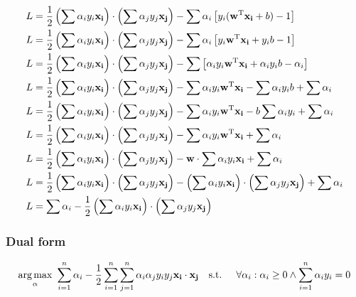 \begin{align*}
    L &= \frac{1}{2} \left( \sum \alpha_i y_i \mathbf{x_i} \right) \cdot \left( \sum \alpha_j y_j \mathbf{x_j} \right)
    - \sum \alpha_i \left[ y_i (\mathbf{w}^{\text{T}} \mathbf{x_i} + b) - 1\right]
\\
    L &= \frac{1}{2} \left( \sum \alpha_i y_i \mathbf{x_i} \right) \cdot \left( \sum \alpha_j y_j \mathbf{x_j} \right)
    - \sum \alpha_i \left[ y_i \mathbf{w}^{\text{T}} \mathbf{x_i} + y_i b - 1\right]
\\
    L &= \frac{1}{2} \left( \sum \alpha_i y_i \mathbf{x_i} \right) \cdot \left( \sum \alpha_j y_j \mathbf{x_j} \right)
    - \sum \left[ \alpha_i y_i \mathbf{w}^{\text{T}} \mathbf{x_i} + \alpha_i y_i b - \alpha_i \right]
\\
    L &= \frac{1}{2} \left( \sum \alpha_i y_i \mathbf{x_i} \right) \cdot \left( \sum \alpha_j y_j \mathbf{x_j} \right)
    - \sum \alpha_i y_i \mathbf{w}^{\text{T}} \mathbf{x_i} - \sum \alpha_i y_i b + \sum \alpha_i
\\
    L &= \frac{1}{2} \left( \sum \alpha_i y_i \mathbf{x_i} \right) \cdot \left( \sum \alpha_j y_j \mathbf{x_j} \right)
    - \sum \alpha_i y_i \mathbf{w}^{\text{T}} \mathbf{x_i} - b \sum \alpha_i y_i + \sum \alpha_i 
\\
    L &= \frac{1}{2} \left( \sum \alpha_i y_i \mathbf{x_i} \right) \cdot \left( \sum \alpha_j y_j \mathbf{x_j} \right)
    - \sum \alpha_i y_i \mathbf{w}^{\text{T}} \mathbf{x_i} + \sum \alpha_i 
\\
    L &= \frac{1}{2} \left( \sum \alpha_i y_i \mathbf{x_i} \right) \cdot \left( \sum \alpha_j y_j \mathbf{x_j} \right)
    - \mathbf{w} \cdot \sum \alpha_i y_i \mathbf{x_i} + \sum \alpha_i 
\\
    L &= \frac{1}{2} \left( \sum \alpha_i y_i \mathbf{x_i} \right) \cdot \left( \sum \alpha_j y_j \mathbf{x_j} \right)
    - \left( \sum \alpha_i y_i \mathbf{x_i} \right) \cdot \left( \sum \alpha_j y_j \mathbf{x_j} \right) + \sum \alpha_i 
\\
    L &= \sum \alpha_i - \frac{1}{2} \left( \sum \alpha_i y_i \mathbf{x_i} \right) \cdot \left( \sum \alpha_j y_j \mathbf{x_j} \right)
\end{align*}

\subsubsection*{Dual form}
\begin{align}
    \underset{\mathbf{\alpha}}{\text{arg} \max}\ \sum_{i=1}^n \alpha_i - \frac{1}{2} \sum_{i=1}^n \sum_{j=1}^n \alpha_i \alpha_j y_i y_j \mathbf{x_i} \cdot \mathbf{x_j}
    \text{\quad s.t. \quad} \forall \alpha_i : \alpha_i \ge 0 \land \sum_{i=1}^n \alpha_i y_i = 0
\end{align}

